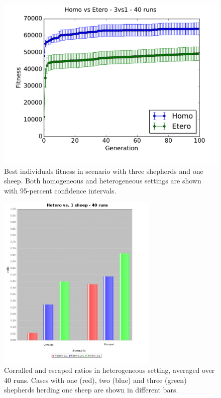 \documentclass[conference]{IEEEtran}
\begin{document}
\begin{figure}[ht]
	\centering
	\includegraphics[width=1\hsize]{imgs/homo3v1-hetero3v1-bestSoFar.pdf}
	\caption{Best individuals fitness in scenario with three shepherds and one sheep. Both homogeneous and heterogeneous settings are shown with 95-percent confidence intervals.}
	\label{fig:3v1_homo_vs_hetero}
\end{figure}


\begin{figure}[ht]
	\centering
	\includegraphics[width=3in]{imgs/hetero_1v1-hetero_2v1-hetero_3v1-ratio-bar.jpg}
	\caption{Corralled and escaped ratios in heterogeneous setting, averaged over 40 runs. Cases with one (red), two (blue) and three (green) shepherds herding one sheep are shown in different bars.}
	\label{fig:ratios_oneSheep}
\end{figure}
\end{document}
